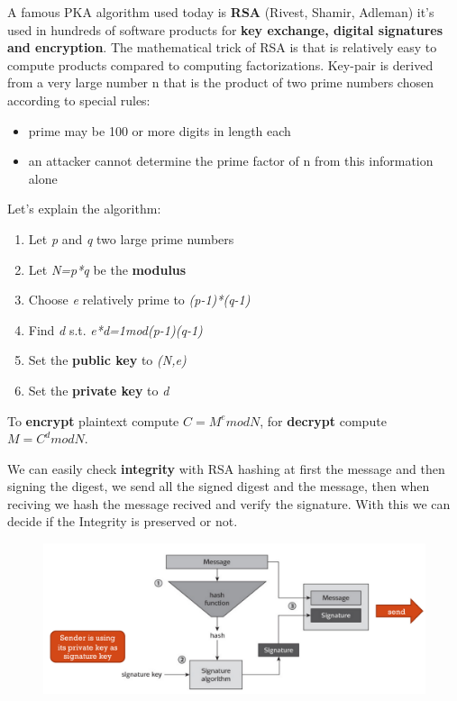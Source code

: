    A famous PKA algorithm used today is \textbf{RSA} (Rivest, Shamir, Adleman) it's used in hundreds of software products for \textbf{key exchange, digital signatures and encryption}. The mathematical trick of RSA is that is relatively easy to compute products compared to computing factorizations. Key-pair is derived from a very large number n that is the product of two prime numbers chosen according to special rules:
    \begin{itemize}
        \item prime may be 100 or more digits in length each
        \item an attacker cannot determine the prime factor of n from this information alone
    \end{itemize}
    Let's explain the algorithm:
    \begin{enumerate}
        \item Let \textit{p} and \textit{q} two large prime numbers
        \item Let \textit{N=p*q} be the \textbf{modulus}
        \item Choose \textit{e} relatively prime to \textit{(p-1)*(q-1)}
        \item Find \textit{d} s.t. \textit{e*d=1mod(p-1)(q-1)}
        \item Set the \textbf{public key} to \textit{(N,e)}
        \item Set the \textbf{private key} to \textit{d}
    \end{enumerate}
    To \textbf{encrypt} plaintext compute $C=M^emodN$, for \textbf{decrypt} compute $M=C^dmodN$.
    
    We can easily check \textbf{integrity} with RSA hashing at first the message and then signing the digest, we send all the signed digest and the message, then when reciving we hash the message recived and verify the signature. With this we can decide if the Integrity is preserved or not.
    
    \begin{figure}[h!]
        \centering
        \includegraphics[scale=0.3]{images/intrsa1.png}
    \end{figure}
    
